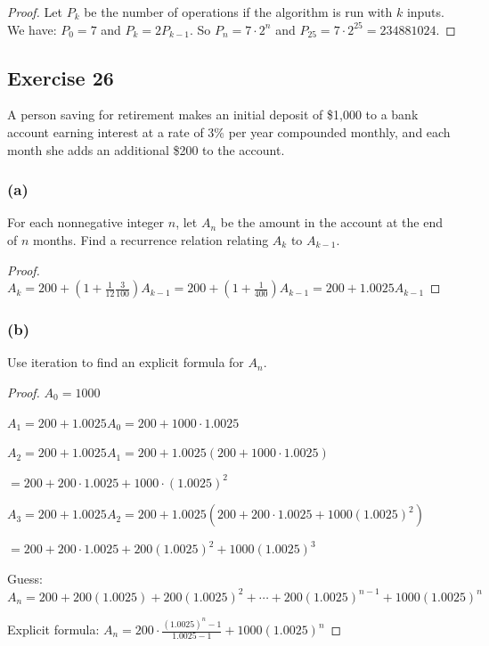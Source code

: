 \documentclass[14pt]{extarticle}
\newcommand{\dps}{\displaystyle}
\begin{document}
\begin{proof}
Let $P_k$ be the number of operations if the algorithm is run with $k$ inputs. We have: \(P_0 = 7\) and 
\(P_k = 2P_{k-1}\). So \(P_n = 7 \cdot 2^n\) and \(P_{25} = 7 \cdot 2^{25} = 234881024\).
\end{proof}

\subsection{Exercise 26}
A person saving for retirement makes an initial deposit of \$1,000 to a bank account earning interest at a rate of 3\% 
per year compounded monthly, and each month she adds an additional \$200 to the account.

\subsubsection{(a)}
For each nonnegative integer $n$, let $A_n$ be the amount in the account at the end of $n$ months. Find a recurrence 
relation relating $A_k$ to \(A_{k-1}\).

\begin{proof}
\(A_k = 200 + (1 + \frac{1}{12}\frac{3}{100})A_{k-1} = 200 + (1 + \frac{1}{400})A_{k-1} = 200 + 1.0025 A_{k-1}\)
\end{proof}

\subsubsection{(b)}
Use iteration to find an explicit formula for \(A_n\).

\begin{proof}
\(A_0 = 1000\)

\(A_1 = 200 + 1.0025 A_0 = 200 + 1000 \cdot 1.0025\)

\(A_2 = 200 + 1.0025 A_1 = 200 + 1.0025 (200 + 1000 \cdot 1.0025)\) 

\(= 200 + 200 \cdot 1.0025 + 1000 \cdot (1.0025)^2\)

\(A_3 = 200 + 1.0025 A_2 = 200 + 1.0025 (200 + 200 \cdot 1.0025 + 1000(1.0025)^2) \)

\(= 200 + 200 \cdot 1.0025 + 200(1.0025)^2 + 1000(1.0025)^3\)

Guess: \(A_n = 200 + 200(1.0025) + 200(1.0025)^2 + \cdots + 200(1.0025)^{n-1} + 1000(1.0025)^n\)

Explicit formula: \(A_n = \dps 200 \cdot \frac{(1.0025)^n - 1}{1.0025 - 1} + 1000(1.0025)^n\)
\end{proof}
\end{document}
